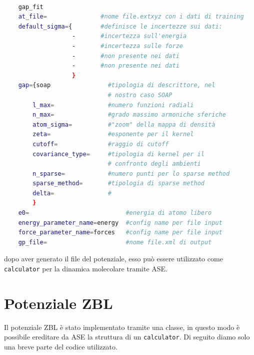 \begin{lstlisting}[caption={Snippet per il calcolo del GAP}, label={code:gap-libatom}, language=bash]

    gap_fit 
    at_file=               #nome file.extxyz con i dati di training 
    default_sigma={        #definisce le incertezze sui dati:
                   -       #incertezza sull'energia
                   -       #incertezza sulle forze 
                   -       #non presente nei dati
                   -       #non presente nei dati
                   } 
    gap={soap                #tipologia di descrittore, nel 
                             # nostro caso SOAP
        l_max=               #numero funzioni radiali
        n_max=               #grado massimo armoniche sferiche  
        atom_sigma=          #"zoom" della mappa di densità  
        zeta=                #esponente per il kernel
        cutoff=              #raggio di cutoff
        covariance_type=     #tipologia di kernel per il 
                             # confronto degli ambienti
        n_sparse=            #numero punti per lo sparse method
        sparse_method=       #tipologia di sparse method
        delta=               #
        } 
    e0=                           #energia di atomo libero
    energy_parameter_name=energy  #config name per file input
    force_parameter_name=forces   #config name per file input
    gp_file=                      #nome file.xml di output 

\end{lstlisting}

dopo aver generato il file del potenziale, esso può essere utilizzato come \texttt{calculator} per la dinamica molecolare tramite ASE.


\section{Potenziale ZBL} %

Il potenziale ZBL è stato implementato tramite una classe, in questo modo è possibile ereditare da ASE la struttura di un \texttt{calculator}. Di seguito diamo solo una breve parte del codice utilizzato.

